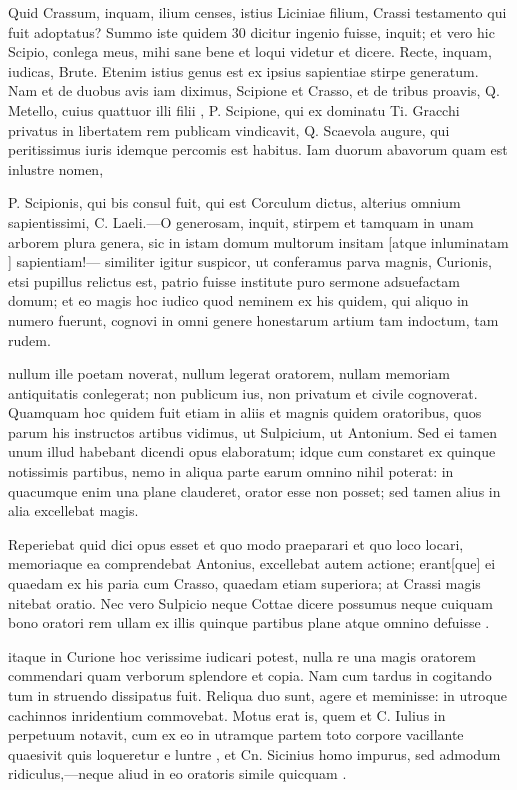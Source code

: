  Quid Crassum, inquam, ilium censes, istius Liciniae filium, Crassi testamento qui fuit adoptatus? Summo iste quidem 30 dicitur ingenio fuisse, inquit; et vero hic Scipio, conlega meus, mihi sane bene et loqui videtur et dicere. Recte, inquam, iudicas, Brute. Etenim istius genus est ex ipsius sapientiae stirpe generatum. Nam et de duobus avis iam diximus, Scipione et Crasso, et de tribus proavis, Q. Metello, cuius quattuor illi filii , P. Scipione, qui ex dominatu Ti. Gracchi privatus in libertatem rem publicam vindicavit, Q. Scaevola augure, qui peritissimus iuris idemque percomis est habitus. Iam duorum abavorum quam est inlustre nomen,

 P. Scipionis, qui bis consul fuit, qui est Corculum dictus, alterius omnium sapientissimi, C. Laeli.—O generosam, inquit, stirpem et tamquam in unam arborem plura genera, sic in istam domum multorum insitam [atque inluminatam ] sapientiam!— similiter igitur suspicor, ut conferamus parva magnis, Curionis, etsi pupillus relictus est, patrio fuisse institute puro sermone adsuefactam domum; et eo magis hoc iudico quod neminem ex his quidem, qui aliquo in numero fuerunt, cognovi in omni genere honestarum artium tam indoctum, tam rudem.

 nullum ille poetam noverat, nullum legerat oratorem, nullam memoriam antiquitatis conlegerat; non publicum ius, non privatum et civile cognoverat. Quamquam hoc quidem fuit etiam in aliis et magnis quidem oratoribus, quos parum his instructos artibus vidimus, ut Sulpicium, ut Antonium. Sed ei tamen unum illud habebant dicendi opus elaboratum; idque cum constaret ex quinque notissimis partibus, nemo in aliqua parte earum omnino nihil poterat: in quacumque enim una plane clauderet, orator esse non posset; sed tamen alius in alia excellebat magis.

 Reperiebat quid dici opus esset et quo modo praeparari et quo loco locari, memoriaque ea comprendebat Antonius, excellebat autem actione; erant[que] ei quaedam ex his paria cum Crasso, quaedam etiam superiora; at Crassi magis nitebat oratio. Nec vero Sulpicio neque Cottae dicere possumus neque cuiquam bono oratori rem ullam ex illis quinque partibus plane atque omnino defuisse .

 itaque in Curione hoc verissime iudicari potest, nulla re una magis oratorem commendari quam verborum splendore et copia. Nam cum tardus in cogitando tum in struendo dissipatus fuit. Reliqua duo sunt, agere et meminisse: in utroque cachinnos inridentium commovebat. Motus erat is, quem et C. Iulius in perpetuum notavit, cum ex eo in utramque partem toto corpore vacillante quaesivit quis loqueretur e luntre , et Cn. Sicinius homo impurus, sed admodum ridiculus,—neque aliud in eo oratoris simile quicquam .

